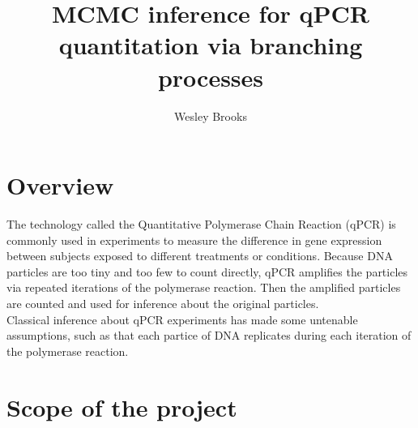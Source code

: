 \documentclass[12pt]{article}
\title{MCMC inference for qPCR quantitation via branching processes}
\author{Wesley Brooks}
\date{}                                           %
\begin{document}

\maketitle


\section{Overview}
The technology called the Quantitative Polymerase Chain Reaction (qPCR) is commonly used in experiments to measure the difference in gene expression between subjects exposed to different treatments or conditions. Because DNA particles are too tiny and too few to count directly, qPCR amplifies the particles via repeated iterations of the polymerase reaction. Then the amplified particles are counted and used for inference about the original particles.\\

Classical inference about qPCR experiments has made some untenable assumptions, such as that each partice of DNA replicates during each iteration of the polymerase reaction. \cite{hanlon:2012}\\


\section{Scope of the project}






\end{document}
